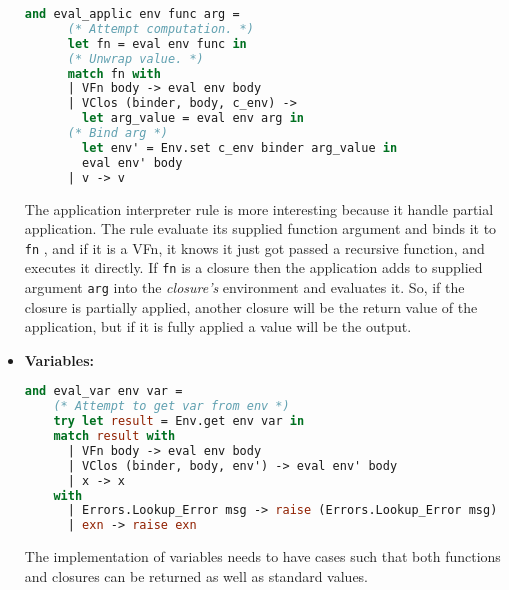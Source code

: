 \documentclass{l4proj}
\begin{document}
\begin{itemize}
   
    \begin{lstlisting}[language=Caml, caption=The PyFunc interpreter's application rule.]
    and eval_applic env func arg =
      (* Attempt computation. *)
      let fn = eval env func in
      (* Unwrap value. *)
      match fn with 
      | VFn body -> eval env body
      | VClos (binder, body, c_env) -> 
        let arg_value = eval env arg in
      (* Bind arg *)
        let env' = Env.set c_env binder arg_value in
        eval env' body 
      | v -> v
    \end{lstlisting}
    The application interpreter rule is more interesting because it handle partial application.
    The rule evaluate its supplied function argument and binds it to \texttt{fn} , and if it is a VFn, it knows it just got passed a recursive function, and executes it directly.
    If \texttt{fn} is a closure then the application adds to supplied argument \texttt{arg} into the \emph{closure's} environment and evaluates it.
    So, if the closure is partially applied, another closure will be the return value of the application, but if it is fully applied a value will be the output.
    \item \textbf{Variables:}
    
    \begin{lstlisting}[language=Caml, caption=The PyFunc interpreter's rule for variables.]
    and eval_var env var =
    (* Attempt to get var from env *)
    try let result = Env.get env var in
    match result with
      | VFn body -> eval env body
      | VClos (binder, body, env') -> eval env' body
      | x -> x
    with
      | Errors.Lookup_Error msg -> raise (Errors.Lookup_Error msg)
      | exn -> raise exn
\end{lstlisting}
    The implementation of variables needs to have cases such that both functions and closures can be returned as well as standard values.

\end{itemize}






\end{document}

